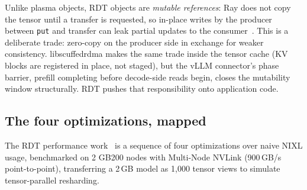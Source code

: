 \documentclass[11pt,letterpaper]{article}
\begin{document}
Unlike plasma objects, RDT objects are \emph{mutable references}: Ray does not copy the tensor until a transfer is requested, so in-place writes by the producer between \texttt{put} and transfer can leak partial updates to the consumer~\cite{ray_rdt_docs}. This is a deliberate trade: zero-copy on the producer side in exchange for weaker consistency. libscuffedrdma makes the same trade inside the tensor cache (KV blocks are registered in place, not staged), but the vLLM connector's phase barrier, prefill completing before decode-side reads begin, closes the mutability window structurally. RDT pushes that responsibility onto application code.

\subsection{The four optimizations, mapped}

The RDT performance work~\cite{anyscale_rdt2} is a sequence of four optimizations over naive NIXL usage, benchmarked on 2 GB200 nodes with Multi-Node NVLink (900\,GB/s point-to-point), transferring a 2\,GB model as 1{,}000 tensor views to simulate tensor-parallel resharding.
\end{document}
